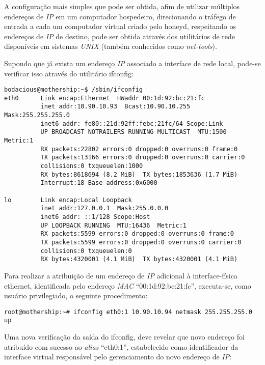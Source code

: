 A configuração mais simples que pode ser obtida, afim de utilizar múltiplos endereços de \textit{IP} em um computador hospedeiro, direcionando o tráfego de entrada a cada um computador virtual criado pelo honeyd, respeitando os endereços de \textit{IP} de destino, pode ser obtida através dos utilitários de rede disponíveis em sistemas \textit{UNIX} (também conhecidos como \textit{net-tools}).

Supondo que já exista um endereço \textit{IP} associado a interface de rede local, pode-se verificar isso através do utilitário ifconfig:

\scriptsize
\begin{verbatim}
bodacious@mothership:~$ /sbin/ifconfig
eth0      Link encap:Ethernet  HWaddr 00:1d:92:bc:21:fc
          inet addr:10.90.10.93  Bcast:10.90.10.255  Mask:255.255.255.0
          inet6 addr: fe80::21d:92ff:febc:21fc/64 Scope:Link
          UP BROADCAST NOTRAILERS RUNNING MULTICAST  MTU:1500  Metric:1
          RX packets:22802 errors:0 dropped:0 overruns:0 frame:0
          TX packets:13166 errors:0 dropped:0 overruns:0 carrier:0
          collisions:0 txqueuelen:1000
          RX bytes:8618694 (8.2 MiB)  TX bytes:1853636 (1.7 MiB)
          Interrupt:18 Base address:0x6000

lo        Link encap:Local Loopback
          inet addr:127.0.0.1  Mask:255.0.0.0
          inet6 addr: ::1/128 Scope:Host
          UP LOOPBACK RUNNING  MTU:16436  Metric:1
          RX packets:5599 errors:0 dropped:0 overruns:0 frame:0
          TX packets:5599 errors:0 dropped:0 overruns:0 carrier:0
          collisions:0 txqueuelen:0
          RX bytes:4320001 (4.1 MiB)  TX bytes:4320001 (4.1 MiB)
\end{verbatim}
\normalsize

Para realizar a atribuição de um endereço de \textit{IP} adicional à interface-física ethernet, identificada pelo endereço \textit{MAC} ``00:1d:92:bc:21:fc'', executa-se, como usuário privilegiado, o seguinte procedimento:

\scriptsize
\begin{verbatim}
root@mothership:~# ifconfig eth0:1 10.90.10.94 netmask 255.255.255.0 up
\end{verbatim}
\normalsize

Uma nova verificação da saída do ifconfig, deve revelar que novo endereço foi atribuído com sucesso ao \textit{alias} ``eth0:1'', estabelecido como identificador da interface virtual responsável pelo gerenciamento do novo endereço de \textit{IP}:

